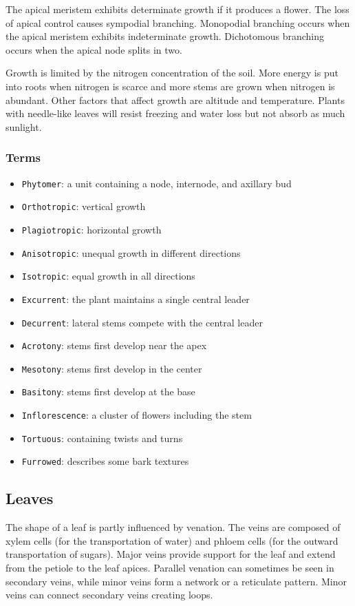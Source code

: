 \documentclass[10pt]{article}
\begin{document}
The apical meristem exhibits determinate growth if it produces a flower. The loss of apical control causes sympodial branching. Monopodial branching occurs when the apical meristem exhibits indeterminate growth. Dichotomous branching occurs when the apical node splits in two.

Growth is limited by the nitrogen concentration of the soil. More energy is put into roots when nitrogen is scarce and more stems are grown when nitrogen is abundant. Other factors that affect growth are altitude and temperature. Plants with needle-like leaves will resist freezing and water loss but not absorb as much sunlight.

\subsubsection{Terms}
\begin{itemize}
\item \texttt{Phytomer}: a unit containing a node, internode, and axillary bud
\item \texttt{Orthotropic}: vertical growth
\item \texttt{Plagiotropic}: horizontal growth
\item \texttt{Anisotropic}: unequal growth in different directions
\item \texttt{Isotropic}: equal growth in all directions
\item \texttt{Excurrent}: the plant maintains a single central leader
\item \texttt{Decurrent}: lateral stems compete with the central leader
\item \texttt{Acrotony}: stems first develop near the apex
\item \texttt{Mesotony}: stems first develop in the center
\item \texttt{Basitony}: stems first develop at the base
\item \texttt{Inflorescence}: a cluster of flowers including the stem
\item \texttt{Tortuous}: containing twists and turns
\item \texttt{Furrowed}: describes some bark textures
\end{itemize}

\subsection{Leaves}
The shape of a leaf is partly influenced by venation. The veins are composed of xylem cells (for the transportation of water) and phloem cells (for the outward transportation of sugars). Major veins provide support for the leaf and extend from the petiole to the leaf apices. Parallel venation can sometimes be seen in secondary veins, while minor veins form a network or a reticulate pattern. Minor veins can connect secondary veins creating loops.
\end{document}
